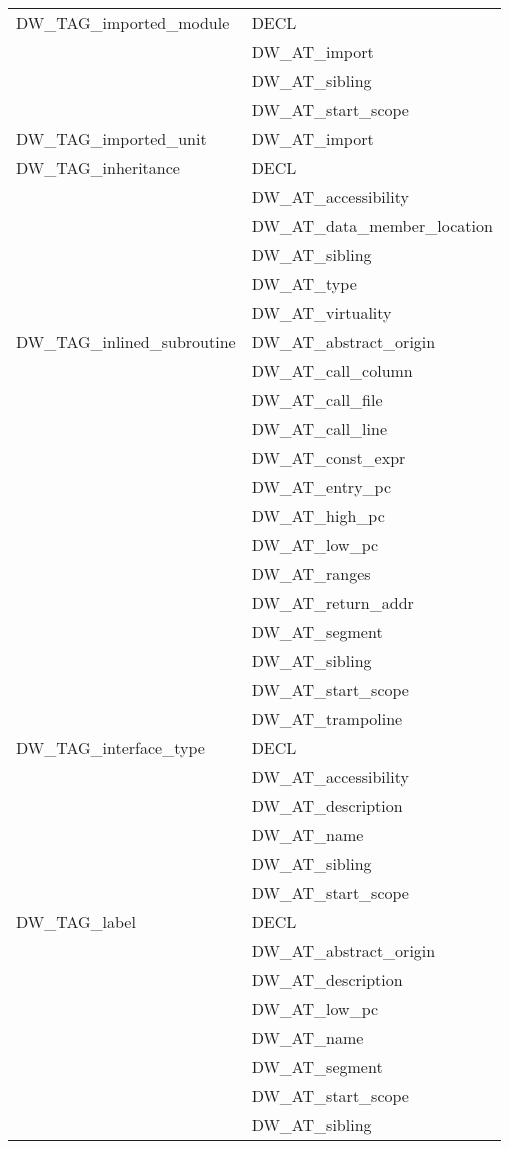 \begin{longtable}{l|p{8cm}}
DW\_TAG\_imported\_module
&DECL \\
&DW\_AT\_import \\
&DW\_AT\_sibling \\
&DW\_AT\_start\_scope \\

DW\_TAG\_imported\_unit
&DW\_AT\_import \\

DW\_TAG\_inheritance
&DECL \\
&DW\_AT\_accessibility \\
&DW\_AT\_data\_member\_location \\
&DW\_AT\_sibling \\
&DW\_AT\_type \\
&DW\_AT\_virtuality \\

DW\_TAG\_inlined\_subroutine
&DW\_AT\_abstract\_origin \\
&DW\_AT\_call\_column \\
&DW\_AT\_call\_file \\
&DW\_AT\_call\_line \\
&DW\_AT\_const\_expr \\
&DW\_AT\_entry\_pc \\
&DW\_AT\_high\_pc \\
&DW\_AT\_low\_pc \\
&DW\_AT\_ranges \\
&DW\_AT\_return\_addr \\
&DW\_AT\_segment \\
&DW\_AT\_sibling \\
&DW\_AT\_start\_scope \\
&DW\_AT\_trampoline \\

DW\_TAG\_interface\_type
&DECL \\
&DW\_AT\_accessibility \\
&DW\_AT\_description \\
&DW\_AT\_name \\
&DW\_AT\_sibling \\
&DW\_AT\_start\_scope \\

DW\_TAG\_label
&DECL \\
&DW\_AT\_abstract\_origin \\
&DW\_AT\_description \\
&DW\_AT\_low\_pc \\
&DW\_AT\_name \\
&DW\_AT\_segment \\
&DW\_AT\_start\_scope \\
&DW\_AT\_sibling \\


\end{longtable}
